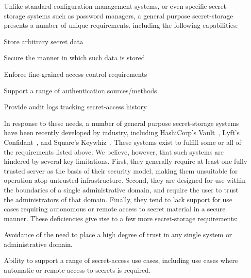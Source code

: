 Unlike standard configuration management systems, or even specific
secret-storage systems such as password managers, a general purpose
secret-storage presents a number of unique requirements, including the
following capabilities:

\begin{packed_item}
\item Store arbitrary secret data
\item Secure the manner in which such data is stored
\item Enforce fine-grained access control requirements
\item Support a range of authentication sources/methods
\item Provide audit logs tracking secret-access history
\end{packed_item}

In response to these needs, a number of general purpose secret-storage
systems have been recently developed by industry, including
HashiCorp's Vault~\cite{vault}, Lyft's Confidant~\cite{confidant}, and
Square's Keywhiz~\cite{keywhiz}. These systems exist to fulfill some
or all of the requirements listed above. We believe, however, that
such systems are hindered by several key limitations. First, they
generally require at least one fully trusted server as the basis of
their security model, making them unsuitable for operation atop
untrusted infrastructure. Second, they are designed for use within the
boundaries of a single administrative domain, and require the user to
trust the administrators of that domain. Finally, they tend to lack
support for use cases requiring autonomous or remote access to secret
material in a secure manner. These deficiencies give rise to a few
more secret-storage requirements:

\begin{packed_item}
\item Avoidance of the need to place a high degree of trust in any
  single system or administrative domain.
\item Ability to support a range of secret-access use cases, including
  use cases where automatic or remote access to secrets is required.
\end{packed_item}

